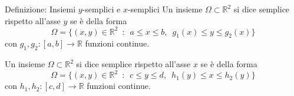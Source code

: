 \documentclass[x11names]{article}
\begin{document}
	\begin{center}
		\colorbox{myblue}{\begin{minipage}{5.75in}
				\begin{blues}{Definizione: Insiemi \(y\)-semplici e \(x\)-semplici}
					Un insieme \(\Omega \subset \mathbb{R}^2\) si dice semplice rispetto all'asse \(y\) se è della forma
					\[ 
					\Omega = \{(x,y)\in \mathbb{R}^2 \;\ : \;\ a\leq x \leq b, \;\ g_{1}(x) \leq y \leq g_{2}(x)\}
					\]
					con \(g_{1},g_2:[a,b]\to \mathbb{R}\) funzioni continue.
					
					Un insieme \(\Omega \subset \mathbb{R}^2\) si dice semplice rispetto all'asse \(x\) se è della forma
					\[ 
					\Omega = \{(x,y)\in \mathbb{R}^2 \;\ : \;\ c\leq y \leq d, \;\ h_{1}(y) \leq x \leq h_{2}(y)\}
					\]
					con \(h_{1},h_2:[c,d]\to \mathbb{R}\) funzioni continue.
				\end{blues}
		\end{minipage}}      
	\end{center}
	
	
	
\end{document}
